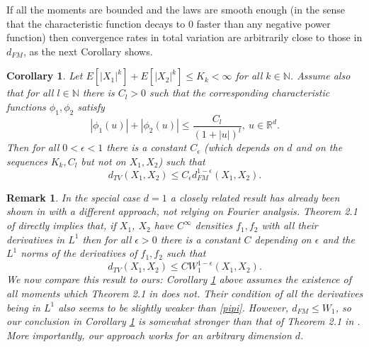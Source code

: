 \documentclass{article}
\newtheorem{corollary}[theorem]{Corollary}
\newtheorem{remark}[theorem]{Remark}
\begin{document}
If all the moments are bounded and the laws are smooth enough (in the sense that the characteristic function
decays to $0$ faster than any negative power function) then convergence rates in total variation are
arbitrarily close to those in $d_{FM}$, as the next Corollary shows. 

\begin{corollary}\label{fourier2}
Let $E[|X_{1}|^{k}]+E[|X_{2}|^{k}]\leq K_{k}<\infty$ for all $k\in\mathbb{N}$. Assume also that for all $l\in\mathbb{N}$ there is
$C_{l}>0$ such that the corresponding characteristic functions $\phi_{1},\phi_{2}$ satisfy
\begin{equation}\label{pipi}
|\phi_{1}(u)|+|\phi_{2}(u)|\leq \frac{C_{l}}{(1+|u|)^{l}},\ u\in\mathbb{R}^{d}.
\end{equation}
Then for all $0<\epsilon<1$ there is a constant $C_{\epsilon}$
(which depends on $d$ and on the sequences $K_{k},C_{l}$ but not on $X_{1},X_{2}$)
such that
$$
d_{TV}(X_{1},X_{2})\leq C_{\epsilon}d_{FM}^{1-\epsilon}(X_{1},X_{2}).
$$
\end{corollary}

\begin{remark} In the special case $d=1$ a closely related result
has already been shown in \cite{che} with a different approach, not relying on Fourier analysis. 
Theorem 2.1 of \cite{che} directly implies that, if $X_{1}$, $X_{2}$ have $C^{\infty}$ densities 
$f_{1},f_{2}$ with all their derivatives in $L^{1}$ then for all $\epsilon>0$ there is a constant 
$C$ depending on $\epsilon$ and the $L^{1}$
norms of the derivatives of $f_{1},f_{2}$ such that
$$
d_{TV}(X_{1},X_{2})\leq C W_{1}^{1-\epsilon}(X_{1},X_{2}).
$$
We now compare this result to ours: Corollary \ref{fourier2} above assumes the existence of all moments which Theorem 2.1 
in \cite{che} does not. Their condition of all
the derivatives being in $L^{1}$ also seems to be slightly weaker than \eqref{pipi}. However, $d_{FM}\leq W_{1}$, so our conclusion
in Corollary \ref{fourier2} is somewhat stronger than that of Theorem 2.1 in \cite{che}.
More importantly, our approach works for an arbitrary dimension $d$. 
\end{remark}
\end{document}
